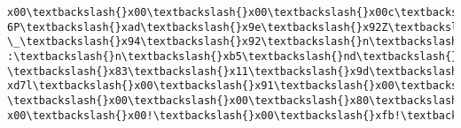 \documentclass[11pt]{article}
\begin{document}
\begin{Verbatim}[commandchars=\\\{\}]
x00\textbackslash{}x00\textbackslash{}x00\textbackslash{}x00c\textbackslash{}x00\textbackslash{}x00\textbackslash{}x00\textbackslash{}x00\textbackslash{}x00\textbackslash{}x00\textbackslash{}x00\textbackslash{}x9b\textbackslash{}xec\textbackslash{}x17\textbackslash{}xea\textbackslash{}x1b\textbackslash{}x10\textbackslash{}xc9\textbackslash{}xc8P\textbackslash{}xc
6P\textbackslash{}xad\textbackslash{}x9e\textbackslash{}x92Z\textbackslash{}x9c\textbackslash{}\textbackslash{}\textbackslash{}xa4n\textbackslash{}xa5\textbackslash{}xa0\^{}Sj\textbackslash{}xa8\textbackslash{}xae\textbackslash{}xa3\textbackslash{}xa0\textbackslash{}x9e\textbackslash{}x96\_TR\textbackslash{}x94\textbackslash{}x98\textbackslash{}x17\textbackslash{}x9f
\_\textbackslash{}x94\textbackslash{}x92\textbackslash{}n\textbackslash{}x12wK\textbackslash{}xcc)N\textbackslash{}x05\textbackslash{}x8a\textbackslash{}x17g\$\textbackslash{}x16\textbackslash{}xa4\textbackslash{}x02\textbackslash{}xf9\textbackslash{}x1a\textbackslash{}x86\textbackslash{}xa6:\textbackslash{}n\textbackslash{}x86\textbackslash{}xa6\textbackslash{}x9a
:\textbackslash{}n\textbackslash{}xb5\textbackslash{}nd\textbackslash{}x02.\textbackslash{}x060`d@\textbackslash{}x05\textbackslash{}xe8|\textbackslash{}x98\textbackslash{}x00.q\textbackslash{}xc2\textbackslash{}xa2\textbackslash{}x8c\textbackslash{}xd8\textbackslash{}xc4\textbackslash{}xf0\textbackslash{}x0b\textbackslash{}xe1b\textbackslash{}xe35
\textbackslash{}x83\textbackslash{}x11\textbackslash{}x9d\textbackslash{}x03\textbackslash{}x00PK\textbackslash{}x01\textbackslash{}x02\textbackslash{}x14\textbackslash{}x03\textbackslash{}x14\textbackslash{}x00\textbackslash{}x00\textbackslash{}x00\textbackslash{}x08\textbackslash{}x00\textbackslash{}x00\textbackslash{}x00!\textbackslash{}x00\textbackslash{}x96\textbackslash{}
xd7l\textbackslash{}x00\textbackslash{}x91\textbackslash{}x00\textbackslash{}x00\textbackslash{}x00\textbackslash{}xd1\textbackslash{}x00\textbackslash{}x00\textbackslash{}x00\textbackslash{}x05\textbackslash{}x00\textbackslash{}x00\textbackslash{}x00\textbackslash{}x00\textbackslash{}x00\textbackslash{}x00\textbackslash{}x00\textbackslash{}x00\textbackslash{}x00
\textbackslash{}x00\textbackslash{}x00\textbackslash{}x80\textbackslash{}x01\textbackslash{}x00\textbackslash{}x00\textbackslash{}x00\textbackslash{}x00S.npyPK\textbackslash{}x01\textbackslash{}x02\textbackslash{}x14\textbackslash{}x03\textbackslash{}x14\textbackslash{}x00\textbackslash{}x00\textbackslash{}x00\textbackslash{}x08\textbackslash{}x00\textbackslash{}
x00\textbackslash{}x00!\textbackslash{}x00\textbackslash{}xfb!\textbackslash{}xf8\textbackslash{}xe6e\textbackslash{}x00\textbackslash{}x00\textbackslash{}x00a\textbackslash{}x01\textbackslash{}x00\textbackslash{}x00\textbackslash{}x05\textbackslash{}x00\textbackslash{}x00\textbackslash{}x00\textbackslash{}x00\textbackslash{}x00\textbackslash{}x00\textbackslash{}

\end{Verbatim}
\end{document}
